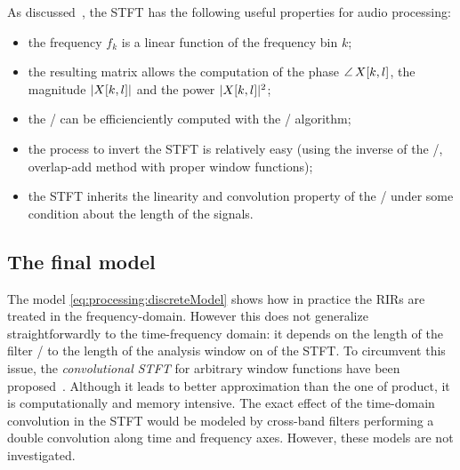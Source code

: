 \mynewline
As discussed~, the \ac{STFT} has the following useful properties for audio processing:
\begin{itemize}
    \item the frequency $f_k$ is a linear function of the frequency bin $k$;
    \item the resulting matrix allows the computation of the phase $\operatorname*{\angle}{X[k,l]}$, the magnitude $|{X[k,l]}|$ and the power $|{X[k,l]}|^2$;
    \item the \DFT/ can be efficienciently computed with the \FFT/ algorithm;
    \item the process to invert the \ac{STFT} is relatively easy (using the inverse of the \DFT/, overlap-add method with proper window functions);
    \item the \ac{STFT} inherits the linearity and convolution property of the \DFT/ under some condition about the length of the signals.
\end{itemize}

%         


\subsection{The final model}\label{subsec:processing:model:stft}
The model \eqref{eq:processing:discreteModel} shows how in practice the \acp{RIR} are treated in the frequency-domain.
However this does not generalize straightforwardly to the time-frequency domain:
it depends on the length of the filter \wrt/ to the length of the analysis window on of the \ac{STFT}.
To circumvent this issue, the \textit{convolutional STFT} for arbitrary window functions have been proposed~.
Although it leads to better approximation than the one of product, it is computationally and memory intensive.
The exact effect of the time-domain convolution in the \ac{STFT} would be modeled by cross-band filters performing a double convolution along time and frequency axes.
However, these models are not investigated.

